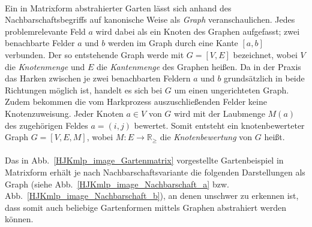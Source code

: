 \documentclass[fontsize=12pt,doubleside,openany,listof=totoc,listof=flat,listof=nochaptergap,numbers=noenddot]{scrbook}
\theoremstyle{style}
\begin{document}
\begin{center}
\begin{minipage}{\linewidth}
\label{HJKmlp_image_Nachbarschaftsvarianten}
\end{minipage}
\end{center}

\phantom \\
\noindent Ein in Matrixform abstrahierter Garten lässt sich anhand des Nachbarschaftsbegriffs 
auf kanonische Weise als \textit{Graph}\label{Graph} veranschaulichen. Jedes problemrelevante
Feld $a$ wird dabei als ein Knoten des Graphen aufgefasst; zwei benachbarte Felder $a$
und $b$ werden im Graph durch eine Kante $[a,b]$ verbunden. Der so entstehende
Graph werde mit $G=[V,E]$ bezeichnet, wobei $V$ die \textit{Knotenmenge}\label{Knotenmenge} und $E$ die \textit{Kantenmenge}\label{Kantenmenge} des Graphen heißen. Da in der Praxis das Harken zwischen je zwei benachbarten Feldern $a$ und $b$ grundsätzlich in beide Richtungen möglich ist, handelt es sich bei $G$ um einen ungerichteten Graph. Zudem bekommen die vom
Harkprozess auszuschließenden Felder keine Knotenzuweisung. Jeder Knoten $a \in
V$ von $G$ wird mit der Laubmenge $M(a)$ des zugehörigen Feldes $a=(i,j)$
bewertet. Somit entsteht ein knotenbewerteter Graph $G=[V,E,M]$, wobei $M:E
\rightarrow \mathbb{R}_\geq$ die \textit{Knotenbewertung}\label{Knotenbewertung} von $G$ heißt.
\\ \\
Das in Abb.~\ref{HJKmlp_image_Gartenmatrix} vorgestellte Gartenbeispiel in Matrixform
erhält je nach Nachbarschaftsvariante  die folgenden Darstellungen als Graph 
(siehe Abb.~\ref{HJKmlp_image_Nachbarschaft_a} bzw. Abb.~\ref{HJKmlp_image_Nachbarschaft_b}),
an denen unschwer zu erkennen ist, dass somit auch beliebige Gartenformen
mittels Graphen abstrahiert werden können.
\end{document}
